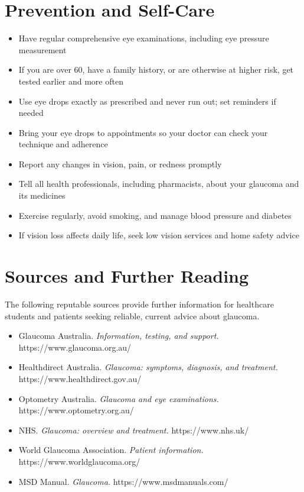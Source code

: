 \section*{Prevention and Self-Care}
\begin{itemize}
    \item Have regular comprehensive eye examinations, including eye pressure measurement
    \item If you are over 60, have a family history, or are otherwise at higher risk, get tested earlier and more often
    \item Use eye drops exactly as prescribed and never run out; set reminders if needed
    \item Bring your eye drops to appointments so your doctor can check your technique and adherence
    \item Report any changes in vision, pain, or redness promptly
    \item Tell all health professionals, including pharmacists, about your glaucoma and its medicines
    \item Exercise regularly, avoid smoking, and manage blood pressure and diabetes
    \item If vision loss affects daily life, seek low vision services and home safety advice
\end{itemize}

\section*{Sources and Further Reading}
The following reputable sources provide further information for healthcare students and patients seeking reliable, current advice about glaucoma.

\begin{itemize}
    \item Glaucoma Australia. \textit{Information, testing, and support.} https://www.glaucoma.org.au/
    \item Healthdirect Australia. \textit{Glaucoma: symptoms, diagnosis, and treatment.} https://www.healthdirect.gov.au/
    \item Optometry Australia. \textit{Glaucoma and eye examinations.} https://www.optometry.org.au/
    \item NHS. \textit{Glaucoma: overview and treatment.} https://www.nhs.uk/
    \item World Glaucoma Association. \textit{Patient information.} https://www.worldglaucoma.org/
    \item MSD Manual. \textit{Glaucoma.} https://www.msdmanuals.com/
\end{itemize}
